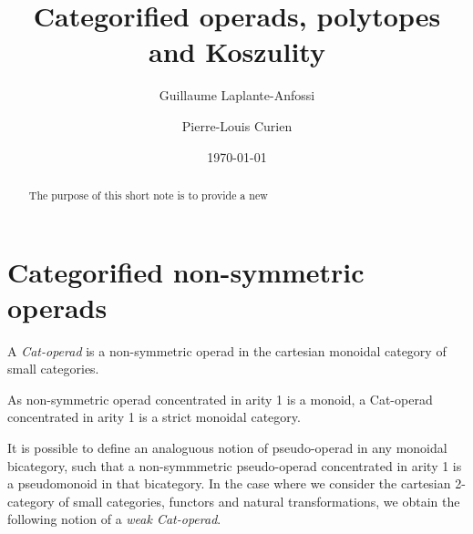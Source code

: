 \documentclass[10pt]{amsart}
\title{Categorified operads, polytopes and Koszulity}
\author{Guillaume Laplante-Anfossi}
\author{Pierre-Louis Curien}
\date{\today}
\theoremstyle{definition}
\theoremstyle{remark}
\numberwithin{equation}{section}
\newcommand{\0}{\color{blue}{\mathsf{0}}}
\begin{document}
\begin{abstract}
The purpose of this short note is to provide a new 
\end{abstract}


\maketitle



\section{Categorified non-symmetric operads}

\cite{LA21}
A \emph{Cat-operad} is a non-symmetric operad in the cartesian monoidal category of small categories.

As non-symmetric operad concentrated in arity 1 is a monoid, a Cat-operad concentrated in arity 1 is a strict monoidal category. 

It is possible to define an analoguous notion of pseudo-operad in any monoidal bicategory, such that a non-symmmetric pseudo-operad concentrated in arity 1 is a pseudomonoid in that bicategory. In the case where we consider the cartesian 2-category of small categories, functors and natural transformations, we obtain the following notion of a \emph{weak Cat-operad}. 
\end{document}
